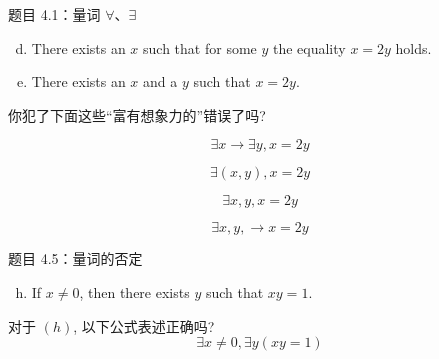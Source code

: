 \begin{frame}{}
  \begin{exampleblock}{题目 4.1：量词 $\forall$、$\exists$}
    \begin{enumerate}[(a)]
      \setcounter{enumi}{3}
      \item There exists an $x$ such that for some $y$ the equality $x = 2y$ holds.
      \item There exists an $x$ and a $y$ such that $x = 2y$.
    \end{enumerate}
  \end{exampleblock}

  \vspace{0.60cm}
  \pause
  你犯了下面这些``富有想象力的''错误了吗?

  \[
    \exists x \to \exists y, x = 2y
  \]

  \[
    \exists (x,y), x = 2y
  \]

  \[
    \exists x, y, x = 2y
  \]

  \[
    \exists x, y, \to x = 2y
  \]
\end{frame}

\begin{frame}{}
  \begin{exampleblock}{题目 4.5：量词的否定}
    \begin{enumerate}[(a)]
      \setcounter{enumi}{7}
      \item If $x \neq 0$, then there exists $y$ such that $xy = 1$.
    \end{enumerate}
  \end{exampleblock}

  \vspace{0.50cm}
  对于 $(h)$, 以下公式表述正确吗?
  \[
    \exists x \neq 0, \exists y (xy = 1)
  \]
\end{frame}

